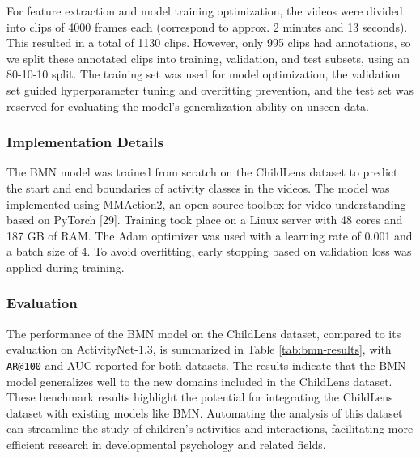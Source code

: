 \documentclass[
  man,floatsintext]{apa6}
\begin{document}
For feature extraction and model training optimization, the videos were divided into clips of 4000 frames each (correspond to approx. 2 minutes and 13 seconds). This resulted in a total of 1130 clips. However, only 995 clips had annotations, so we split these annotated clips into training, validation, and test subsets, using an 80-10-10 split. The training set was used for model optimization, the validation set guided hyperparameter tuning and overfitting prevention, and the test set was reserved for evaluating the model's generalization ability on unseen data.

\subsubsection{Implementation Details}\label{implementation-details}

The BMN model was trained from scratch on the ChildLens dataset to predict the start and end boundaries of activity classes in the videos. The model was implemented using MMAction2, an open-source toolbox for video understanding based on PyTorch {[}29{]}. Training took place on a Linux server with 48 cores and 187 GB of RAM. The Adam optimizer was used with a learning rate of 0.001 and a batch size of 4. To avoid overfitting, early stopping based on validation loss was applied during training.

\subsubsection{Evaluation}\label{evaluation}

The performance of the BMN model on the ChildLens dataset, compared to its evaluation on ActivityNet-1.3, is summarized in Table \ref{tab:bmn-results}, with \href{mailto:AR@100}{\nolinkurl{AR@100}} and AUC reported for both datasets. The results indicate that the BMN model generalizes well to the new domains included in the ChildLens dataset. These benchmark results highlight the potential for integrating the ChildLens dataset with existing models like BMN. Automating the analysis of this dataset can streamline the study of children's activities and interactions, facilitating more efficient research in developmental psychology and related fields.
\end{document}
